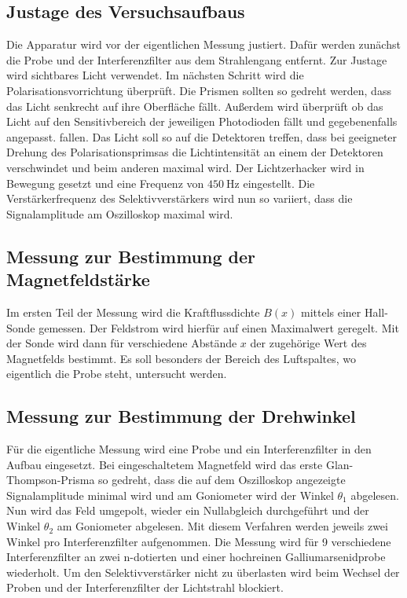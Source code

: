 \subsection{Justage des Versuchsaufbaus}
\label{sub:Justage}

Die Apparatur wird vor der eigentlichen Messung justiert. Dafür werden zunächst die Probe und der Interferenzfilter aus dem Strahlengang
entfernt. Zur Justage wird sichtbares Licht verwendet.
Im nächsten Schritt wird die Polarisationsvorrichtung überprüft. Die Prismen sollten so gedreht werden, dass das Licht senkrecht auf ihre Oberfläche fällt.
Außerdem wird überprüft ob das Licht auf den Sensitivbereich der jeweiligen Photodioden fällt und gegebenenfalls angepasst.
fallen. Das Licht soll so auf die Detektoren treffen, dass bei geeigneter Drehung des Polarisationsprimsas die Lichtintensität an einem der Detektoren verschwindet und beim anderen maximal wird.
Der Lichtzerhacker wird in Bewegung gesetzt und eine Frequenz von $\qty{450}{\hertz}$ eingestellt.
Die Verstärkerfrequenz des Selektivverstärkers wird nun so variiert, dass die Signalamplitude am Oszilloskop maximal wird.




\subsection{Messung zur Bestimmung der Magnetfeldstärke}
\label{sub:Magnetfeld}

Im ersten Teil der Messung wird die Kraftflussdichte $B(x)$ mittels einer Hall-Sonde gemessen.
Der Feldstrom wird hierfür auf einen Maximalwert geregelt. Mit der Sonde wird dann für verschiedene Abstände $x$ der zugehörige
Wert des Magnetfelds bestimmt. Es soll besonders der Bereich des Luftspaltes, wo eigentlich die Probe steht, untersucht werden.


\subsection{Messung zur Bestimmung der Drehwinkel}
\label{sub:Drehwinkel}

Für die eigentliche Messung wird eine Probe und ein Interferenzfilter in den Aufbau eingesetzt. Bei eingeschaltetem Magnetfeld wird das erste Glan-Thompson-Prisma
so gedreht, dass die auf dem Oszilloskop angezeigte Signalamplitude minimal wird und am Goniometer wird der Winkel $\theta_1$ abgelesen.
Nun wird das Feld umgepolt, wieder ein Nullabgleich durchgeführt und der Winkel $\theta_2$ am Goniometer abgelesen.
Mit diesem Verfahren werden jeweils zwei Winkel pro Interferenzfilter aufgenommen. Die Messung wird für 9 verschiedene Interferenzfilter
an zwei n-dotierten und einer hochreinen Galliumarsenidprobe wiederholt.
Um den Selektivverstärker nicht zu überlasten wird beim Wechsel der Proben und der Interferenzfilter der Lichtstrahl blockiert.






